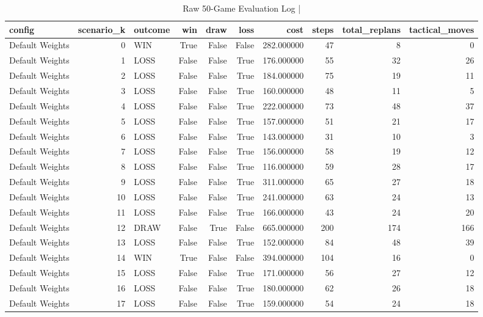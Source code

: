\begin{table}[htbp]
\centering
\caption{Raw 50-Game Evaluation Log | \stampline}
\label{tab:partC_games_raw}
\begin{tabular}{lrlrrrrrrr}
\toprule
config & scenario\_k & outcome & win & draw & loss & cost & steps & total\_replans & tactical\_moves \\
\midrule
Default Weights & 0 & WIN & True & False & False & 282.000000 & 47 & 8 & 0 \\
Default Weights & 1 & LOSS & False & False & True & 176.000000 & 55 & 32 & 26 \\
Default Weights & 2 & LOSS & False & False & True & 184.000000 & 75 & 19 & 11 \\
Default Weights & 3 & LOSS & False & False & True & 160.000000 & 48 & 11 & 5 \\
Default Weights & 4 & LOSS & False & False & True & 222.000000 & 73 & 48 & 37 \\
Default Weights & 5 & LOSS & False & False & True & 157.000000 & 51 & 21 & 17 \\
Default Weights & 6 & LOSS & False & False & True & 143.000000 & 31 & 10 & 3 \\
Default Weights & 7 & LOSS & False & False & True & 156.000000 & 58 & 19 & 12 \\
Default Weights & 8 & LOSS & False & False & True & 116.000000 & 59 & 28 & 17 \\
Default Weights & 9 & LOSS & False & False & True & 311.000000 & 65 & 27 & 18 \\
Default Weights & 10 & LOSS & False & False & True & 241.000000 & 63 & 24 & 13 \\
Default Weights & 11 & LOSS & False & False & True & 166.000000 & 43 & 24 & 20 \\
Default Weights & 12 & DRAW & False & True & False & 665.000000 & 200 & 174 & 166 \\
Default Weights & 13 & LOSS & False & False & True & 152.000000 & 84 & 48 & 39 \\
Default Weights & 14 & WIN & True & False & False & 394.000000 & 104 & 16 & 0 \\
Default Weights & 15 & LOSS & False & False & True & 171.000000 & 56 & 27 & 12 \\
Default Weights & 16 & LOSS & False & False & True & 180.000000 & 62 & 26 & 18 \\
Default Weights & 17 & LOSS & False & False & True & 159.000000 & 54 & 24 & 18 \\

\end{tabular}
\end{table}
